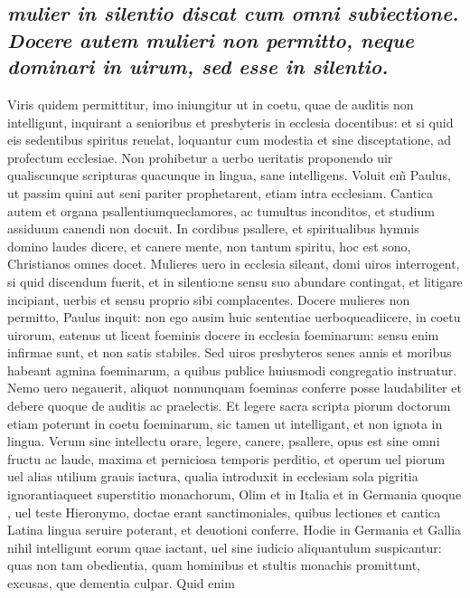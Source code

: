 \documentclass{article}
\begin{document}
\begin{pages}
\subsection*{\textit{mulier in silentio discat cum omni subiectione. Docere autem mulieri non permitto, neque  dominari in uirum, sed esse in silentio. }}\pstart Viris quidem permittitur, imo iniungitur ut in coetu, quae de auditis non intelligunt, inquirant a senioribus et presbyteris in ecclesia docentibus: et si quid eis sedentibus spiritus reuelat, loquantur cum modestia et sine disceptatione, ad profectum ecclesiae. Non prohibetur a uerbo ueritatis proponendo uir qualiscunque  scripturas quacunque  in lingua, sane intelligens. Voluit em̃ Paulus, ut passim quini aut seni pariter prophetarent, etiam intra ecclesiam. Cantica autem et organa psallentiumqueclamores, ac tumultus inconditos, et studium assiduum canendi non docuit. In cordibus psallere, et spiritualibus hymnis domino laudes dicere, et canere mente, non tantum spiritu, hoc est sono, Christianos omnes docet. Mulieres uero in ecclesia sileant, domi uiros interrogent, si quid discendum fuerit, et in silentio:ne sensu suo abundare contingat, et litigare incipiant, uerbis et sensu proprio sibi complacentes. Docere mulieres non permitto, Paulus inquit: non ego ausim huic sententiae uerboqueadiicere, in coetu uirorum, eatenus ut liceat foeminis docere in ecclesia foeminarum: sensu enim infirmae sunt, et non satis stabiles. Sed uiros presbyteros senes annis et moribus habeant agmina foeminarum, a quibus publice huiusmodi congregatio instruatur. Nemo uero negauerit, aliquot nonnunquam foeminas conferre posse laudabiliter et debere quoque  de auditis ac praelectis. Et legere sacra scripta piorum doctorum etiam poterunt in coetu foeminarum, sic tamen ut intelligant, et non ignota in lingua. Verum sine intellectu orare, legere, canere, psallere, opus est sine omni fructu ac laude, maxima et perniciosa temporis perditio, et operum uel piorum uel alias utilium grauis iactura, qualia introduxit in ecclesiam sola pigritia ignorantiaqueet superstitio monachorum, Olim et in Italia et in Germania quoque , uel teste Hieronymo, doctae erant sanctimoniales, quibus lectiones et cantica Latina lingua seruire poterant, et deuotioni conferre. Hodie in Germania et Gallia nihil intelligunt eorum quae iactant, uel sine iudicio aliquantulum suspicantur: quas non tam obedientia, quam hominibus et stultis monachis promittunt, excusas, que  dementia culpar. Quid enim  \pend

\end{pages}
\end{document}

